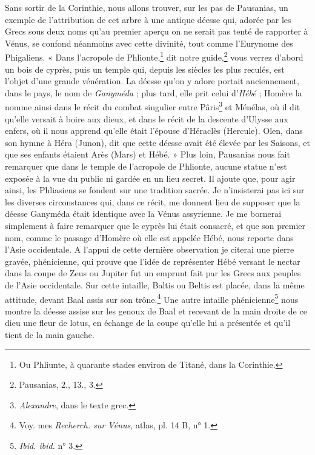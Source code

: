 \documentclass{article}
\begin{document}
Sans sortir de la Corinthie, nous allons trouver, sur les pas de Pausanias, un exemple de l'attribution de cet arbre à une antique déesse qui, adorée par les Grecs sous deux noms qu'au premier aperçu on ne serait pas tenté de rapporter à Vénus, se confond néanmoins avec cette divinité, tout comme l'Eurynome des Phigaliens. « Dans l'acropole de Phlionte,\footnote{Ou Phliunte, à quarante stades environ de Titané, dans la Corinthie.} dit notre guide,\footnote{Pausanias, 2., 13., 3.} vous verrez d'abord un bois de cyprès, puis un temple qui, depuis les siècles les plus reculés, est l'objet d'une grande vénération. La déesse qu'on y adore portait anciennement, dans le pays, le nom de \emph{Ganyméda} ; plus tard, elle prit celui d'\emph{Hébé} ; Homère la nomme ainsi dans le récit du combat singulier entre Pâris\footnote{\emph{Alexandre}, dans le texte grec.} et Ménélas, où il dit qu'elle versait à boire aux dieux, et dans le récit de la descente d'Ulysse aux enfers, où il nous apprend qu'elle était l'épouse d'Héraclès (Hercule). Olen, dans son hymne à Héra (Junon), dit que cette déesse avait été élevée par les Saisons, et que ses enfants étaient Arès (Mars) et Hébé. » Plus loin, Pausanias nous fait remarquer que dans le temple de l'acropole de Phlionte, aucune statue n'est exposée à la vue du public ni gardée en un lieu secret. Il ajoute que, pour agir ainsi, les Phliasiens se fondent sur une tradition sacrée. Je n'insisterai pas ici sur les diverses circonstances qui, dans ce récit, me donnent lieu de supposer que la déesse Ganyméda était identique avec la Vénus assyrienne. Je me bornerai simplement à faire remarquer que le cyprès lui était consacré, et que son premier nom, comme le passage d'Homère où elle est appelée Hébé, nous reporte dans l'Asie occidentale. A l'appui de cette dernière observation je citerai une pierre gravée, phénicienne, qui prouve que l'idée de représenter Hébé versant le nectar dans la coupe de Zeus ou Jupiter fut un emprunt fait par les Grecs aux peuples de l'Asie occidentale. Sur cette intaille, Baltis ou Beltis est placée, dans la même attitude, devant Baal assis sur son trône.\footnote{Voy. mes \emph{Recherch. sur Vénus}, atlas, pl. 14 B, n° 1.} Une autre intaille phénicienne\footnote{\emph{Ibid. ibid.} n° 3.} nous montre la déesse assise sur les genoux de Baal et recevant de la main droite de ce dieu une fleur de lotus, en échange de la coupe qu'elle lui a présentée et qu'il tient de la main gauche.
\end{document}
